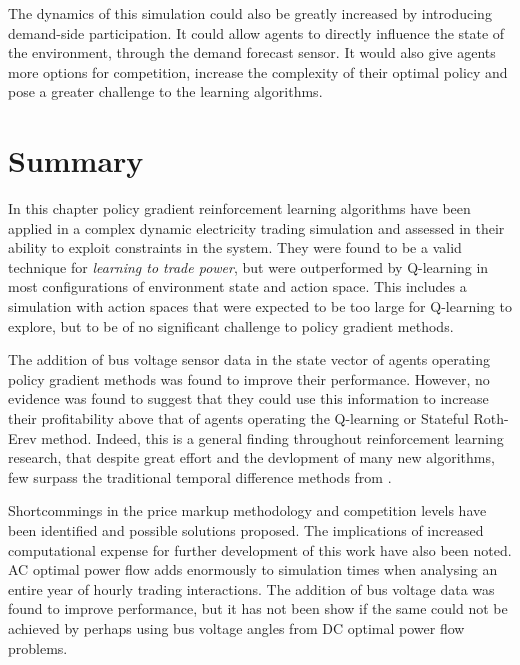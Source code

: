 The dynamics of this simulation could also be greatly increased by introducing
demand-side participation.  It could allow agents to directly influence the
state of the environment, through the demand forecast sensor.  It would
also give agents more options for competition, increase the complexity of
their optimal policy and pose a greater challenge to the learning algorithms.

\section{Summary}
In this chapter policy gradient reinforcement learning algorithms have been
applied in a complex dynamic electricity trading simulation and assessed in
their ability to exploit constraints in the system.  They were found to be a
valid technique for \textit{learning to trade power}, but were outperformed by
Q-learning in most configurations of environment state and action space.  This
includes a simulation with action spaces that were expected to be too large for
Q-learning to explore, but to be of no significant challenge to policy gradient
methods.

The addition of bus voltage sensor data in the state vector of agents
operating policy gradient methods was found to improve their performance.
However, no evidence was found to suggest that they could use this information
to increase their profitability above that of agents operating the Q-learning
or Stateful Roth-Erev method.  Indeed, this is a general finding throughout
reinforcement learning research, that despite great effort and the devlopment of
many new algorithms, few surpass the traditional temporal difference methods
from .

Shortcommings in the price markup methodology and competition levels have been
identified and possible solutions proposed.  The implications of increased
computational expense for further development of this work have also been noted.
AC optimal power flow adds enormously to simulation times when analysing an
entire year of hourly trading interactions.  The addition of bus voltage data
was found to improve performance, but it has not been show if the same could not
be achieved by perhaps using bus voltage angles from DC optimal power flow
problems.
